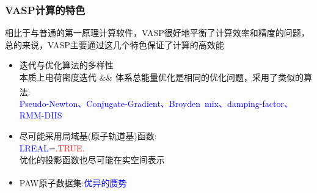 \documentclass[cjk,slidestop,handout,compress,mathserif,blue]{beamer}	%
\newcommand{\upcite}[1]{\hspace{0ex}\textsuperscript{\cite{#1}}} %
\begin{document}
\frame
{
	\frametitle{\textrm{VASP}计算的特色}
	相比于与普通的第一原理计算软件，\textrm{VASP}很好地平衡了计算效率和精度的问题，总的来说，\textrm{VASP}主要通过这几个特色保证了计算的高效能
	\begin{itemize}
	     \item 迭代与优化算法的多样性\\
		     本质上电荷密度迭代 \textrm{\&\&} 体系总能量优化是相同的优化问题，采用了类似的算法\upcite{CMS6-15_1996,PRB54-11169_1996}:\\
			\textcolor{blue}{\textrm{Pseudo-Newton、Conjugate-Gradient、Broyden~mix、damping-factor、RMM-DIIS}}
	     \item 尽可能采用局域基(原子轨道基)函数:~\\
		     \textcolor{blue}{\textrm{LREAL}}=\textcolor{red}{\textrm{.TRUE.}}\\
			优化的投影函数也尽可能在实空间表示
	     \item \textrm{PAW}原子数据集:\textcolor{blue}{优异的赝势}\upcite{PRB59-1758_1999}
	\end{itemize}
}

\end{document}
